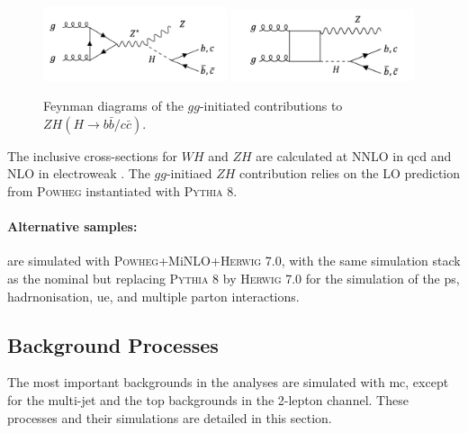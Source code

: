 \begin{figure}[h!]
  \center
  \includegraphics[width=0.48\textwidth]{Images/VH/Feynman/vh2order.png}
  \includegraphics[width=0.48\textwidth]{Images/VH/Feynman/vh3order.png}
  \caption{Feynman diagrams of the $gg$-initiated contributions to $ZH(H\rightarrow b\bar{b}/c\bar{c})$.} 
  \label{fig:feynnloVH}
\end{figure}

The inclusive cross-sections for $WH$ and $ZH$ are calculated at NNLO in \gls{qcd} \cite{BREIN2004149} and NLO in electroweak \cite{PDFLHCrun2}. The $gg$-initiaed $ZH$ contribution relies on the LO prediction from \textsc{Powheg} instantiated with \textsc{Pythia} 8.

\paragraph{Alternative samples:} are simulated with \textsc{Powheg}+MiNLO+\textsc{Herwig} 7.0, with the same simulation stack as the nominal but replacing \textsc{Pythia} 8 by \textsc{Herwig} 7.0 \cite{bellm2017herwig} for the simulation of the \gls{ps}, hadrnonisation, \gls{ue}, and multiple parton interactions.

\subsection{Background Processes}
The most important backgrounds in the analyses are simulated with \gls{mc}, except for the multi-jet and the top backgrounds in the 2-lepton channel. These processes and their simulations are detailed in this section.

